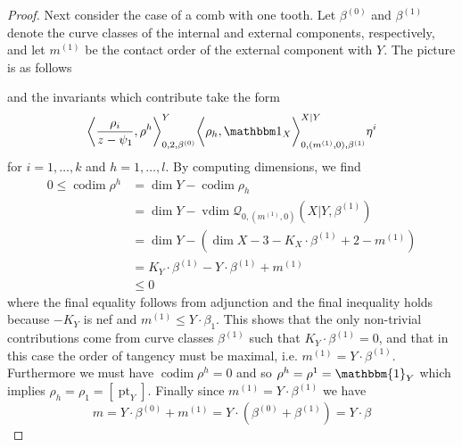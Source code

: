 \documentclass[11pt]{amsart}
\newcommand{\Q}[4]{\mathcal{Q}_{#1,#2}(#3,#4)}
\newcommand{\pt}{\operatorname{pt}}
\newcommand{\codim}{\operatorname{codim}}
\newcommand{\vdim}{\operatorname{vdim}}
\theoremstyle{definition}
\theoremstyle{definition}
\begin{document}
\begin{proof}
Next consider the case of a comb with one tooth. Let $\beta^{(0)}$ and $\beta^{(1)}$ denote the curve classes of the internal and external components, respectively, and let $m^{(1)}$ be the contact order of the external component with $Y$. The picture is as follows
\begin{center}
\end{center}
and the invariants which contribute take the form
\begin{equation*} \bigg\langle \dfrac{\rho_i}{z-\psi_1},\rho^h\bigg\rangle_{0,2,\beta^{(0)}}^Y \bigg\langle \rho_h, \mathbbm 1_{X}\bigg\rangle_{0,(m^{(1)},0),\beta^{(1)}}^{X|Y}\eta^i \end{equation*}
for $i = 1, \ldots, k$ and $h = 1, \ldots, l$. By computing dimensions, we find
\begin{align*}
0\leq \codim \rho^h &= \dim Y-\codim \rho_h \\
&= \dim Y-\vdim \Q{0}{(m^{(1)},0)}{X|Y}{\beta^{(1)}} \\
&= \dim Y-(\dim X-3-K_{X}\cdot \beta^{(1)}+2-m^{(1)})\\
&= K_Y \cdot \beta^{(1)} - Y \cdot \beta^{(1)}+m^{(1)} \\
&\leq 0
\end{align*}
where the final equality follows from adjunction and the final inequality holds because $-K_Y$ is nef and $m^{(1)}\leq Y \cdot \beta_1$. This shows that the only non-trivial contributions come from curve classes $\beta^{(1)}$ such that $K_Y \cdot \beta^{(1)}=0$, and that in this case the order of tangency must be maximal, i.e. $m^{(1)}=Y \cdot \beta^{(1)}$. Furthermore we must have $\codim \rho^h = 0$ and so $\rho^h = \rho^1 = \mathbbm{1}_Y$ which implies $\rho_h = \rho_1 = [\pt_Y]$. Finally since $m^{(1)}=Y \cdot \beta^{(1)}$ we have
\begin{equation*} m = Y \cdot \beta^{(0)}+m^{(1)}=Y \cdot (\beta^{(0)} + \beta^{(1)}) = Y \cdot \beta \end{equation*}

\end{proof}
\end{document}
